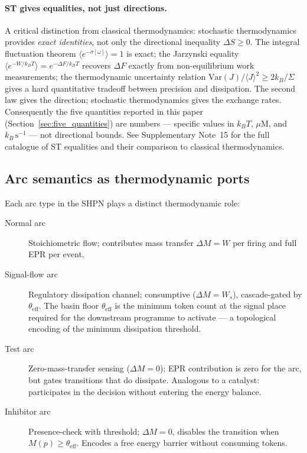 \documentclass[11pt,a4paper]{article}
\newcommand{\thetaeff}{\theta_{\mathrm{eff}}}
\begin{document}
\paragraph{ST gives equalities, not just directions.}
A critical distinction from classical thermodynamics: stochastic thermodynamics
provides \emph{exact identities}, not only the directional inequality
$\Delta S \geq 0$.  The integral fluctuation theorem
$\langle e^{-\sigma[\omega]}\rangle = 1$ is exact; the Jarzynski equality
$\langle e^{-W/k_BT}\rangle = e^{-\Delta F/k_BT}$ recovers $\Delta F$
exactly from non-equilibrium work measurements; the thermodynamic uncertainty
relation $\mathrm{Var}(J)/\langle J\rangle^2 \geq 2k_B/\Sigma$ gives a hard
quantitative tradeoff between precision and dissipation.  The second law gives
the direction; stochastic thermodynamics gives the exchange rates.
Consequently the five quantities reported in this paper
(Section~\ref{sec:five_quantities}) are numbers --- specific values in
$k_BT$, $\mu$M, and $k_B\,\mathrm{s}^{-1}$ --- not directional bounds.
See Supplementary Note~15 for the full catalogue of ST equalities and their
comparison to classical thermodynamics.

\subsection{Arc semantics as thermodynamic ports}

Each arc type in the SHPN plays a distinct thermodynamic role:

\begin{description}
  \item[Normal arc] Stoichiometric flow; contributes mass transfer
    $\Delta M = W$ per firing and full EPR per event.
  \item[Signal-flow arc] Regulatory dissipation channel; consumptive
    ($\Delta M = W_s$), cascade-gated by $\thetaeff$.
    The basin floor $\thetaeff$ is the minimum token count at the signal
    place required for the downstream programme to activate --- a
    topological encoding of the minimum dissipation threshold.
  \item[Test arc] Zero-mass-transfer sensing ($\Delta M = 0$);
    EPR contribution is zero for the arc, but gates transitions that
    do dissipate.
    Analogous to a catalyst: participates in the decision without
    entering the energy balance.
  \item[Inhibitor arc] Presence-check with threshold; $\Delta M = 0$,
    disables the transition when $M(p) \geq \thetaeff$.
    Encodes a free energy barrier without consuming tokens.
\end{description}
\end{document}
